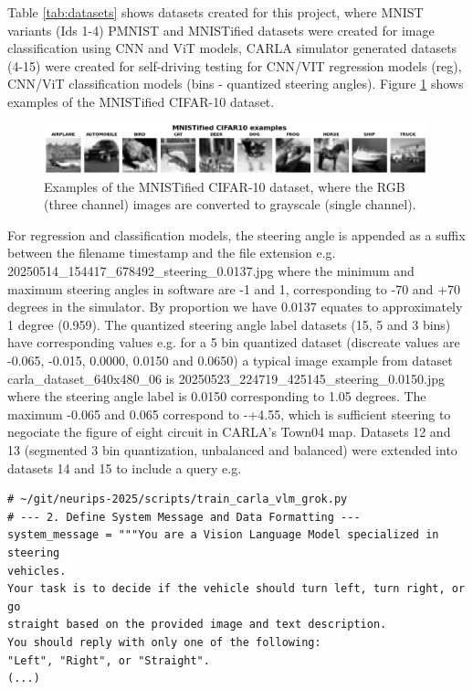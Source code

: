 Table \ref{tab:datasets} shows datasets created for this project, where MNIST variants (Ids 1-4) PMNIST and MNISTified datasets were created for image classification using CNN and ViT models, CARLA simulator generated datasets (4-15) were created for self-driving testing for CNN/VIT regression models (reg), CNN/ViT classification models (bins - quantized steering angles). Figure \ref{fig:mnistified_cifar10} shows examples of the MNISTified CIFAR-10 dataset.

\begin{figure}[h]
\centering
\includegraphics[width=0.99\textwidth]{Figures/Results/mnistified_cifar10.png}
\caption{Examples of the MNISTified CIFAR-10 dataset, where the RGB (three channel) images are converted to grayscale (single channel).}
\label{fig:mnistified_cifar10}
\end{figure}

For regression and classification models, the steering angle is appended as a suffix between the filename timestamp and the file extension e.g. 20250514\_154417\_678492\_steering\_0.0137.jpg where the minimum and maximum steering angles in software are -1 and 1, corresponding to -70 and +70 degrees in the simulator. By proportion we have 0.0137 equates to approximately 1 degree (0.959). The quantized steering angle label datasets (15, 5 and 3 bins) have corresponding values e.g. for a 5 bin quantized dataset (discreate values are -0.065, -0.015, 0.0000, 0.0150 and 0.0650) a typical image example from dataset carla\_dataset\_640x480\_06  is 20250523\_224719\_425145\_steering\_0.0150.jpg where the steering angle label is 0.0150 corresponding to 1.05 degrees. The maximum -0.065 and 0.065 correspond to -+4.55, which is sufficient steering to negociate the figure of eight circuit in CARLA's Town04 map. Datasets 12 and 13 (segmented 3 bin quantization, unbalanced and balanced) were extended  into datasets 14 and 15 to include a query e.g.
\begin{verbatim}
# ~/git/neurips-2025/scripts/train_carla_vlm_grok.py
# --- 2. Define System Message and Data Formatting ---
system_message = """You are a Vision Language Model specialized in steering 
vehicles.
Your task is to decide if the vehicle should turn left, turn right, or go 
straight based on the provided image and text description.
You should reply with only one of the following:
"Left", "Right", or "Straight".
(...)    
\end{verbatim}

